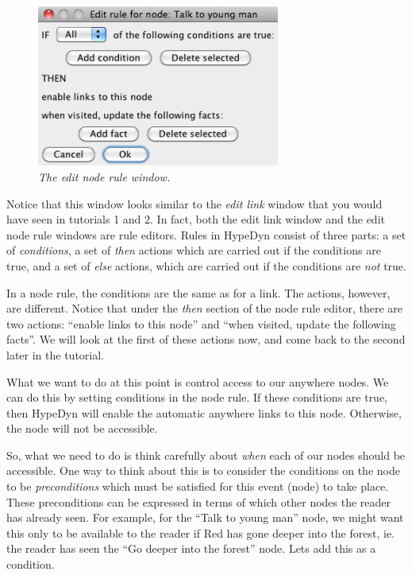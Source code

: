 \documentclass{article}
\begin{document}
\begin{figure}[h]
  \centering
  \includegraphics[width=8cm]{images/hypedyn-tutorial-3-figure-5}
  \caption{\textit{The edit node rule window.}}
\end{figure} 

Notice that this window looks similar to the \textit{edit link} window that you
would have seen in tutorials 1 and 2. In fact, both the edit link window and
the edit node rule windows are rule editors. Rules in HypeDyn consist of three
parts: a set of \textit{conditions}, a set of \textit{then} actions which are
carried out if the conditions are true, and a set of \textit{else} actions,
which are carried out if the conditions are \textit{not} true.

In a node rule, the conditions are the same as for a link. The actions,
however, are different. Notice that under the \textit{then} section of the node
rule editor, there are two actions: ``enable links to this node'' and ``when
visited, update the following facts''. We will look at the first of these
actions now, and come back to the second later in the tutorial.

What we want to do at this point is control access to our anywhere nodes. We
can do this by setting conditions in the node rule. If these conditions are
true, then HypeDyn will enable the automatic anywhere links to this node.
Otherwise, the node will not be accessible.

So, what we need to do is think carefully about \textit{when} each of our nodes
should be accessible. One way to think about this is to consider the conditions
on the node to be \textit{preconditions} which must be satisfied for this event
(node) to take place. These preconditions can be expressed in terms of which
other nodes the reader has already seen. For example, for the ``Talk to young
man'' node, we might want this only to be available to the reader if Red has
gone deeper into the forest, ie. the reader has seen the ``Go deeper into the
forest'' node. Lets add this as a condition.
\end{document}
